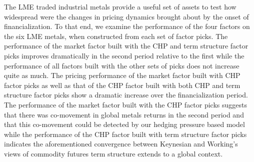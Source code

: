 \documentclass[11pt, letterpaper, doublespacing]{article}
\begin{document}
The LME traded industrial metals provide a useful set of assets to test
how widespread were the changes in pricing dynamics brought about by the
onset of financialization. To that end, we examine the performance of
the four factors on the six LME metals, when constructed from each set
of factor picks. The performance of the market factor built with the CHP
and term structure factor picks improves dramatically in the second
period relative to the first while the performance of all factors built
with the other sets of picks does not increase quite as much. The
pricing performance of the market factor built with CHP factor picks as
well as that of the CHP factor built with both CHP and term structure
factor picks show a dramatic increase over the financialization period.
The performance of the market factor built with the CHP factor picks
suggests that there was co-movement in global metals returns in the
second period and that this co-movement could be detected by our hedging
pressure based model while the performance of the CHP factor built with
term structure factor picks indicates the aforementioned convergence
between Keynesian and Working's views of commodity futures term
structure extends to a global context.
\end{document}
